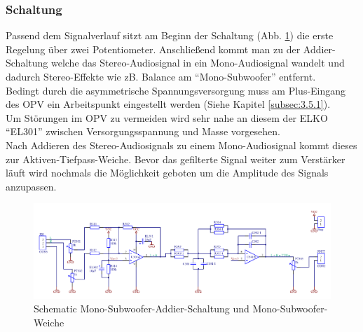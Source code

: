\subsubsection{Schaltung}\label{subsec:4.2.2}
Passend dem Signalverlauf sitzt am Beginn der Schaltung (Abb. \ref{fig:4.2.2.1}) die erste Regelung über zwei Potentiometer.
Anschließend kommt man zu der Addier-Schaltung welche das Stereo-Audiosignal in ein Mono-Audiosignal wandelt und dadurch Stereo-Effekte wie zB. Balance am \enquote{Mono-Subwoofer} entfernt.\\
Bedingt durch die asymmetrische Spannungsversorgung muss am Plus-Eingang des OPV ein Arbeitspunkt eingestellt werden (Siehe Kapitel \ref{subsec:3.5.1}).\\
Um Störungen im OPV zu vermeiden wird sehr nahe an diesem der ELKO \enquote{EL301} zwischen Versorgungsspannung und Masse vorgesehen.\\
Nach Addieren des Stereo-Audiosignals zu einem Mono-Audiosignal kommt dieses zur Aktiven-Tiefpass-Weiche.
Bevor das gefilterte Signal weiter zum Verstärker läuft wird nochmals die Möglichkeit geboten um die Amplitude des Signals anzupassen.
\begin{landscape}
	\vspace*{\fill}
	\begin{figure} [H]
		\centering
		\includegraphics[width=\linewidth,height=0.9\textheight,keepaspectratio]{img/Print3/3mTTWeicheruAddiererDiplSchematic.PNG}
		\caption{Schematic Mono-Subwoofer-Addier-Schaltung und Mono-Subwoofer-Weiche}
		\label {fig:4.2.2.1}
	\end{figure}
	\vfill
\end{landscape}
\raggedbottom


